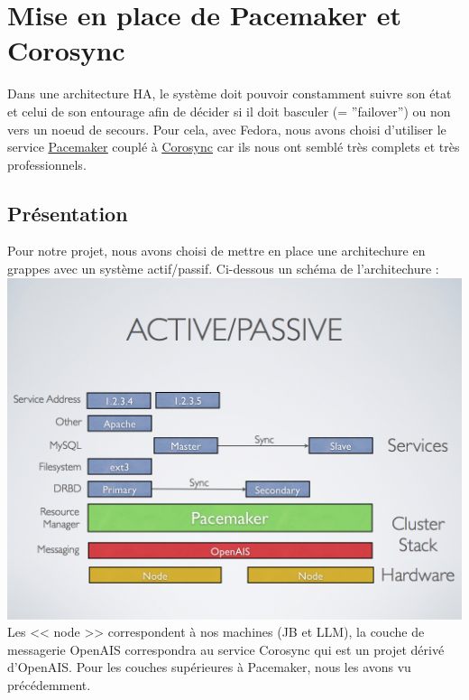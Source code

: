 \documentclass[11pt,a4paper]{report}
\begin{document}
        \section{Mise en place de Pacemaker et Corosync}
            
            Dans une architecture HA, le syst\`eme doit pouvoir constamment suivre son \'etat et celui de son entourage afin de d\'ecider si il doit basculer (= ''failover'') ou non vers un noeud de secours. Pour cela, avec Fedora, nous avons choisi d'utiliser le service \underline{\href{http://clusterlabs.org}{Pacemaker}} coupl\'e \`a \underline{\href{http://www.corosync.org}{Corosync}} car ils nous ont sembl\'e tr\`es complets et tr\`es professionnels.
            
            \subsection{Pr\'esentation}
                
                Pour notre projet, nous avons choisi de mettre en place une architechure en grappes avec un syst\`eme actif/passif. Ci-dessous un sch\'ema de l'architechure :\\
                
                \includegraphics[keepaspectratio=true, width=\textwidth]{content/pacemaker-active-passive.png}\\[1cm]
                
                Les << node >> correspondent \`a nos machines (JB et LLM), la couche de messagerie OpenAIS correspondra au service Corosync qui est un projet d\'eriv\'e d'OpenAIS. Pour les couches sup\'erieures \`a Pacemaker, nous les avons vu pr\'ec\'edemment.\\
                
\end{document}
